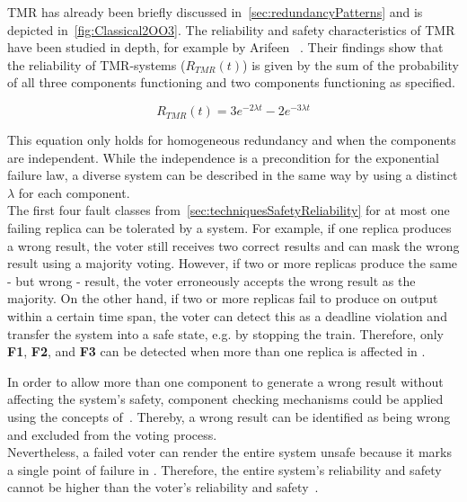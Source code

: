 \noindent
\Gls*{TMR} has already been briefly discussed in~\autoref{sec:redundancyPatterns} and is depicted in~\autoref{fig:Classical2OO3}.
The reliability and safety characteristics of \gls*{TMR} have been studied in depth, for example by Arifeen \etal~\cite{ArifeenFaultTolerantTMR}.
Their findings show that the reliability of \gls*{TMR}-systems ($R_{TMR}(t)$) is given by the sum of the probability of all three components functioning and two components functioning as specified.

\begin{equation}
R_{TMR}(t) = 3e^{-2 \lambda t} - 2e^{-3 \lambda t}
\end{equation}

\noindent
This equation only holds for homogeneous redundancy and when the components are independent.
While the independence is a precondition for the exponential failure law, a diverse system can be described in the same way by using a distinct $\lambda$ for each component.
\\

\noindent
The first four fault classes from~\autoref{sec:techniquesSafetyReliability} for at most one failing replica can be tolerated by a  system.
For example, if one replica produces a wrong result, the voter still receives two correct results and can mask the wrong result using a majority voting.
However, if two or more replicas produce the same - but wrong - result, the voter erroneously accepts the wrong result as the majority.
On the other hand, if two or more replicas fail to produce on output within a certain time span, the voter can detect this as a deadline violation and transfer the system into a safe state, e.g. by stopping the train.
Therefore, only \textbf{F1}, \textbf{F2}, and \textbf{F3} can be detected when more than one replica is affected in .

In order to allow more than one component to generate a wrong result without affecting the system's safety, component checking mechanisms could be applied using the concepts of~\cite{DistributedSafety2020}.
Thereby, a wrong result can be identified as being wrong and excluded from the voting process.
\\

\noindent
Nevertheless, a failed voter can render the entire system unsafe because it marks a single point of failure in .
Therefore, the entire system's reliability and safety cannot be higher than the voter's reliability and safety~\cite{ArifeenFaultTolerantTMR}.

